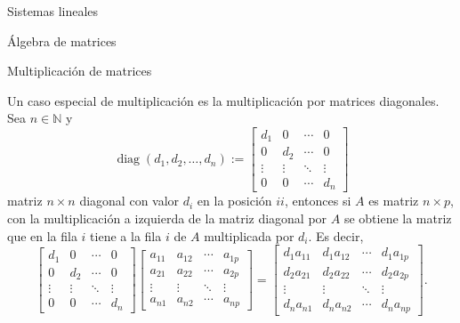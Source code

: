 \begin{chapter}{Sistemas lineales}
\begin{section}{\'Algebra de matrices}
\begin{subsection}{Multiplicaci\'on de matrices}
                \begin{observacion}\label{obs-mult-matrices-diagonales}
                    Un  caso especial de multiplicación es la multiplicación por matrices diagonales. Sea $n \in \mathbb N$ y 
                \begin{equation*}
                    \operatorname{diag}(d_1,d_2,\ldots,d_n) := \begin{bmatrix}
                    d_1 & 0 & \cdots &0 \\
                    0 & d_2 & \cdots &0 \\
                    \vdots & \vdots & \ddots &\vdots \\
                    0 & 0 & \cdots & d_n 
                    \end{bmatrix}
                \end{equation*}
                matriz $n \times n$ diagonal con valor $d_i$  en la posición $ii$,  entonces si $A$ es matriz $n \times p$,  con la multiplicación a izquierda de la matriz diagonal por $A$  se obtiene la matriz que en la fila $i$ tiene a la fila $i$ de $A$ multiplicada por $d_i$.  Es decir,
                \begin{equation*}
                \begin{bmatrix}
                d_1 & 0 & \cdots &0 \\
                0 & d_2 & \cdots &0 \\
                \vdots & \vdots & \ddots &\vdots \\
                0 & 0 & \cdots & d_n 
                \end{bmatrix}
                \begin{bmatrix}
                a_{11} & a_{12} & \cdots &a_{1p} \\
                a_{21} & a_{22} & \cdots &a_{2p}\\
                \vdots & \vdots & \ddots &\vdots \\
                a_{n1} & a_{n2} & \cdots & a_{np} 
                \end{bmatrix}
                =
                \begin{bmatrix}
                d_1a_{11} & d_1a_{12} & \cdots &d_1a_{1p} \\
                d_2a_{21} & d_2a_{22} & \cdots &d_2a_{2p}\\
                \vdots & \vdots & \ddots &\vdots \\
                d_n a_{n1} & d_n a_{n2} & \cdots & d_n a_{np} 
                \end{bmatrix}.

\end{equation*}
\end{observacion}
\end{subsection}
\end{section}
\end{chapter}
